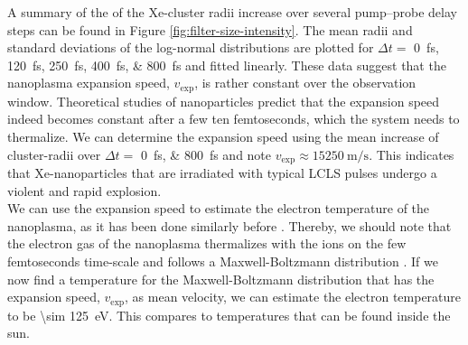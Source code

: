 A summary of the of the Xe-cluster radii increase over several pump--probe delay steps can be found in Figure \ref{fig:filter-size-intensity}. The mean radii and standard deviations of the log-normal distributions are plotted for $\Delta t=$ \SIlist{0;120;250;400;800}{\femto\second} and fitted linearly. These data suggest that the nanoplasma expansion speed, $v_{\text{exp}}$, is rather constant over the observation window. Theoretical studies of nanoparticles \cite{Hau-Riege-2004-PRE,Mikaberidze-2008-PRA,Ho-2016-PRA} predict that the expansion speed indeed becomes constant after a few ten femtoseconds, which the system needs to thermalize. We can determine the expansion speed using the mean increase of cluster-radii over $\Delta t=$ \SIlist{0;800}{\femto\second} and note $v_{\text{exp}}\approx \SI{15250}{\meter\per\second}$. This indicates that Xe-nanoparticles that are irradiated with typical LCLS pulses undergo a violent and rapid explosion.\\[1\baselineskip]
%
We can use the expansion speed to estimate the electron temperature of the nanoplasma, as it has been done similarly before \cite{Gorkhover-2012-PRL}. Thereby, we should note that the electron gas of the nanoplasma thermalizes with the ions on the few femtoseconds time-scale and follows a Maxwell-Boltzmann distribution \cite{Arbeiter-2011-NJP}. If we now find a temperature for the Maxwell-Boltzmann distribution that has the expansion speed, $v_{\text{exp}}$, as mean velocity, we can estimate the electron temperature to be \SI{\sim 125}{\electronvolt}. This compares to temperatures that can be found inside the sun.\\[1\baselineskip]
%
